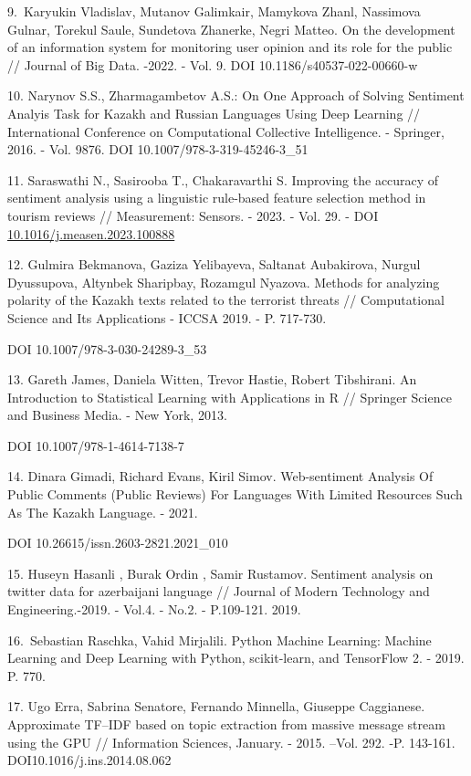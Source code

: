 \begin{references}
9.~Karyukin Vladislav, Mutanov Galimkair, Mamykova Zhanl, Nassimova
Gulnar, Torekul Saule, Sundetova Zhanerke, Negri Matteo. On the
development of an information system for monitoring user opinion and its
role for the public // Journal of Big Data. -2022. - Vol. 9.
DOI 10.1186/s40537-022-00660-w

10. Narynov S.S., Zharmagambetov A.S.: On One Approach of Solving
Sentiment Analyis Task for Kazakh and Russian Languages Using Deep
Learning // International Conference on Computational Collective
Intelligence. - Springer, 2016. - Vol. 9876.
DOI 10.1007/978-3-319-45246-3\_51

11. Saraswathi N., Sasirooba T., Chakaravarthi S. Improving the accuracy
of sentiment analysis using a linguistic rule-based feature selection
method in tourism reviews // Measurement: Sensors. - 2023. - Vol. 29. -
DOI
\href{https://doi.org/10.1016/j.measen.2023.100888}{10.1016/j.measen.2023.100888}

12. Gulmira Bekmanova, Gaziza Yelibayeva, Saltanat Aubakirova, Nurgul
Dyussupova, Altynbek Sharipbay, Rozamgul Nyazova. Methods for analyzing
polarity of the Kazakh texts related to the terrorist threats //
Computational Science and Its Applications - ICCSA 2019. - P. 717-730.

DOI 10.1007/978-3-030-24289-3\_53

13. Gareth James, Daniela Witten, Trevor Hastie, Robert Tibshirani. An
Introduction to Statistical Learning with Applications in R // Springer
Science and Business Media. - New York, 2013.

DOI 10.1007/978-1-4614-7138-7

14. Dinara Gimadi, Richard Evans, Kiril Simov. Web-sentiment Analysis Of
Public Comments (Public Reviews) For Languages With Limited Resources
Such As The Kazakh Language. - 2021. 

DOI  10.26615/issn.2603-2821.2021\_010

15. Huseyn Hasanli , Burak Ordin , Samir Rustamov. Sentiment analysis on
twitter data for azerbaijani language // Journal of Modern Technology
and Engineering.-2019. - Vol.4. - No.2.
- P.109-121. 2019.

16.~Sebastian Raschka, Vahid Mirjalili. Python Machine Learning: Machine
Learning and Deep Learning with Python, scikit-learn, and TensorFlow 2.
- 2019. P. 770.

17. Ugo Erra, Sabrina Senatore, Fernando Minnella, Giuseppe Caggianese.
Approximate TF--IDF based on topic extraction from massive message
stream using the GPU // Information Sciences, January. - 2015. --Vol.
292. -P. 143-161. DOI10.1016/j.ins.2014.08.062
\end{references}

